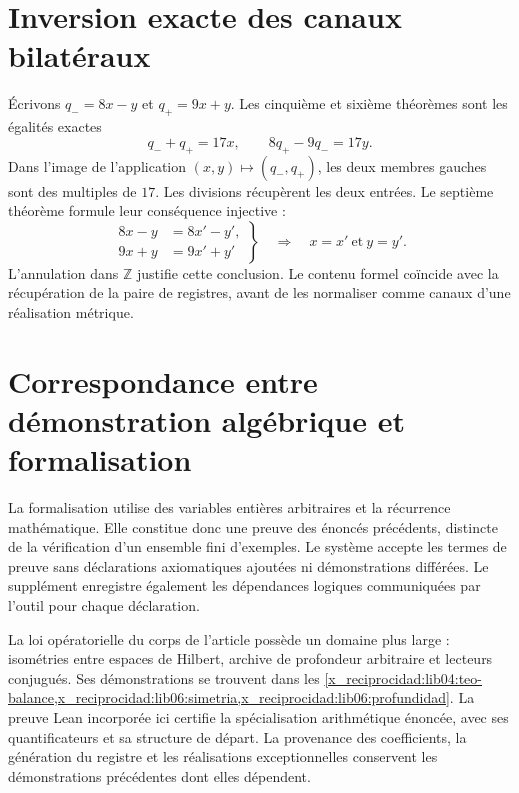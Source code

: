 \section*{Inversion exacte des canaux bilatéraux}

Écrivons \(q_-=8x-y\) et \(q_+=9x+y\). Les cinquième et sixième théorèmes
sont les égalités exactes
\[
 q_-+q_+=17x,\qquad 8q_+-9q_-=17y.
\]
Dans l’image de l’application \((x,y)\mapsto(q_-,q_+)\), les deux membres
gauches sont des multiples de \(17\). Les divisions récupèrent les deux
entrées. Le septième théorème formule leur conséquence injective :
\[
 \left.
 \begin{aligned}
 8x-y&=8x'-y',\\
 9x+y&=9x'+y'
 \end{aligned}
 \right\}
 \quad\Longrightarrow\quad x=x'\ \text{et}\ y=y'.
\]
L’annulation dans \(\mathbb Z\) justifie cette conclusion. Le contenu
formel coïncide avec la récupération de la paire de registres, avant de
les normaliser comme canaux d’une réalisation métrique.

\section*{Correspondance entre démonstration algébrique et formalisation}

La formalisation utilise des variables entières arbitraires et la récurrence mathématique. Elle constitue donc une preuve des énoncés précédents, distincte de la vérification d'un ensemble fini d'exemples. Le système accepte les termes de preuve sans déclarations axiomatiques ajoutées ni démonstrations différées. Le supplément enregistre également les dépendances logiques communiquées par l'outil pour chaque déclaration.

La loi opératorielle du corps de l’article possède un domaine plus large :
isométries entre espaces de Hilbert, archive de profondeur arbitraire et
lecteurs conjugués. Ses démonstrations se trouvent dans les
\cref{x_reciprocidad:lib04:teo-balance,x_reciprocidad:lib06:simetria,x_reciprocidad:lib06:profundidad}. La preuve Lean
incorporée ici certifie la spécialisation arithmétique énoncée, avec
ses quantificateurs et sa structure de départ. La provenance des
coefficients, la génération du registre et les réalisations exceptionnelles
conservent les démonstrations précédentes dont elles dépendent.
